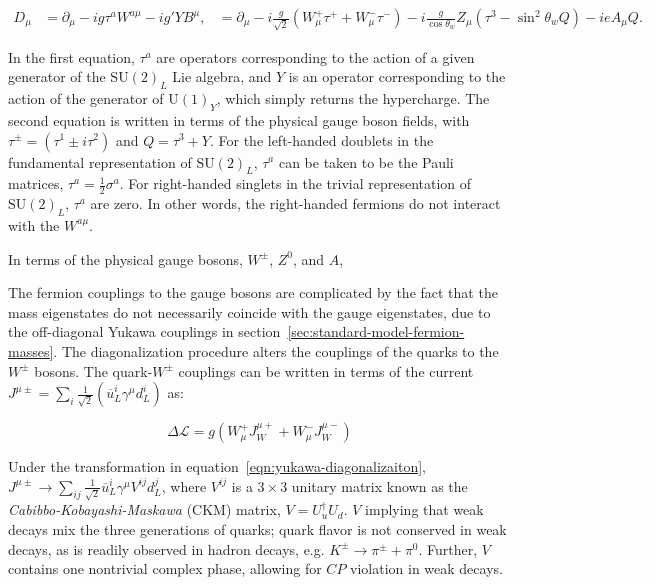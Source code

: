 \begin{align}\label{eqn:covariant-derivative-ew}
	D_{\mu} &= \partial_{\mu} - i g \tau^a W^{a\mu} - i g' Y B^{\mu},
	&= \partial_{\mu} - i \frac{g}{\sqrt{2}}\left(W_{\mu}^+ \tau^+ + W_{\mu}^- \tau^-\right) - i\frac{g}{\cos\theta_w} Z_{\mu}\left(\tau^3 - \sin^2\theta_w Q\right) - i e A_{\mu} Q.
\end{align}

In the first equation, $\tau^a$ are operators corresponding to the action of a given generator of the $\mathrm{SU}(2)_L$ Lie algebra, and $Y$ is an operator corresponding to the action of the generator of $\mathrm{U}(1)_Y$, which simply returns the hypercharge. The second equation is written in terms of the physical gauge boson fields, with $\tau^{\pm}=\left(\tau^1 \pm i \tau^2\right)$ and $Q=\tau^3+Y$. For the left-handed doublets in the fundamental representation of $\mathrm{SU}(2)_L$, $\tau^a$ can be taken to be the Pauli matrices, $\tau^a=\frac12 \sigma^a$. For right-handed singlets in the trivial representation of $\mathrm{SU}(2)_L$, $\tau^a$ are zero. In other words, the right-handed fermions do not interact with the $W^{a\mu}$. 

In terms of the physical gauge bosons, $W^{\pm}$, $Z^0$, and $A$, 

The fermion couplings to the gauge bosons are complicated by the fact that the mass eigenstates do not necessarily coincide with the gauge eigenstates, due to the off-diagonal Yukawa couplings in section~\ref{sec:standard-model-fermion-masses}. The diagonalization procedure alters the couplings of the quarks to the $W^{\pm}$ bosons. The quark-$W^{\pm}$ couplings can be written in terms of the current $J^{\mu\pm}=\sum_{i} \frac1{\sqrt{2}}\left(\overline{u}_L^i\gamma^{\mu}d_L^i\right)$ as:

\begin{equation}
	\Delta\mathcal{L} = g (W^+_{\mu}J^{\mu+}_W + W^{-}_{\mu}J^{\mu -}_{W})
\end{equation}

Under the transformation in equation~\ref{eqn:yukawa-diagonalizaiton}, $J^{\mu\pm}\rightarrow \sum_{ij}\frac{1}{\sqrt{2}} \overline{u}_L^i \gamma^{\mu} V^{ij} d_L^j$, where $V^{ij}$ is a $3\times 3$ unitary matrix known as the \emph{Cabibbo-Kobayashi-Maskawa} (CKM) matrix, $V = U_{u}^{\dagger} U_d$. $V$ implying that weak decays mix the three generations of quarks; quark flavor is not conserved in weak decays, as is readily observed in hadron decays, e.g. $K^{\pm}\rightarrow \pi^{\pm}+\pi^0$. Further, $V$ contains one nontrivial complex phase, allowing for $CP$ violation in weak decays. 

